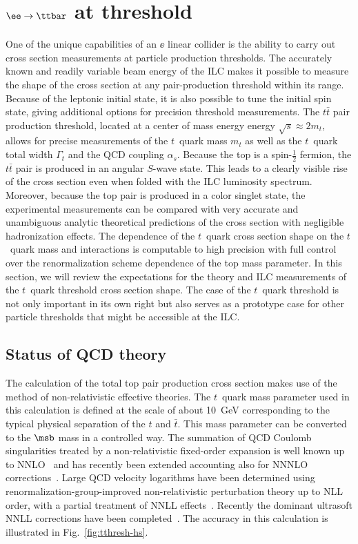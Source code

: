\section{$\ee \rightarrow \ttbar$ at threshold}
One of the unique capabilities of an $\ee$ linear collider is the ability
to carry out cross section measurements at particle 
production thresholds.  The accurately known and readily variable beam 
energy of the ILC makes it possible to measure the shape of the cross section
at any pair-production threshold within its range.
Because of the leptonic initial state, it is also  possible to tune 
the initial spin state, giving additional options for precision threshold 
measurements. 
The $t\bar t$ pair production threshold, located at a center of mass energy
energy  $\sqrt{s}\approx 2 m_t$,  allows for precise measurements of 
the $t$~quark mass $m_t$ as well as the $t$~quark 
total width $\Gamma_t$ and the QCD coupling $\alpha_s$. 
 Because the top is a spin-$\frac{1}{2}$ fermion, the
 $t\bar t$ pair is produced in an angular $S$-wave state.  This leads to
a clearly visible rise of the cross section even when folded with the
 ILC luminosity spectrum. Moreover, because the top pair is 
produced in a color singlet state, the experimental measurements can be 
compared with very accurate and unambiguous 
analytic theoretical predictions of the cross section 
with negligible hadronization effects. The dependence of the 
$t$~quark cross section shape on the $t$~quark mass and interactions
is computable to high precision with full control over the renormalization 
scheme dependence of the top mass parameter.  In this section, we will 
review the expectations for the theory and ILC measurements of the 
$t$~quark threshold cross section shape. The case of the $t$~quark
threshold is not only important in its own right but also serves
 as a prototype case for other particle thresholds that might be accessible at the ILC.

\subsection{ Status of QCD theory}

The calculation of the total top pair production cross section makes use of the 
 method of non-relativistic effective 
theories. The $t$~quark mass parameter used in this calculation is
defined at the scale of about 10~GeV corresponding to the typical physical
separation of the $t$ and $\bar t$.  This mass parameter can be
converted to the $\msb$ mass in a controlled way. The summation of QCD
 Coulomb singularities treated by a 
non-relativistic fixed-order expansion is well known up to 
NNLO~\cite{Hoang:2000yr} and has recently been extended accounting 
also for NNNLO corrections~\cite{Beneke:2008cr}. Large QCD velocity 
logarithms have been determined using renormalization-group-improved 
non-relativistic perturbation theory up to NLL order, with a partial 
treatment of NNLL effects~\cite{Hoang:2001mm,Hoang:2003ns,Pineda:2006ri}.
Recently the dominant ultrasoft NNLL corrections have been 
completed~\cite{Hoang:2006ht,Pineda:2011aw,Hoang:2011gy}. The accuracy
in this calculation is illustrated in Fig.~\ref{fig:tthresh-hs}.

